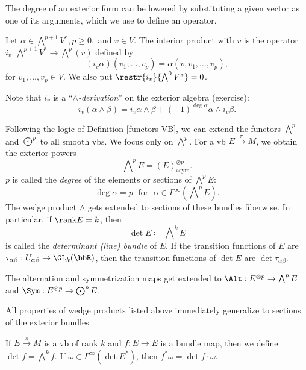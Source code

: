 The degree of an exterior form can be lowered by substituting a given vector as one of its arguments, which we use to define an operator.

\begin{defn}
    Let $\alpha\in\bigwedge\nolimits^{p+1}V^\ast, p\geq 0,$ and $v\in V$. The interior product with $v$ is the operator $i_v:\bigwedge\nolimits^{p+1}V^\ast\to \bigwedge\nolimits^p(v)$ defined by 
    \[(i_v \alpha)(v_1,\ldots,v_p)=\alpha(v,v_1,\ldots,v_p),\]
    for $v_1,\ldots,v_p\in V$. We also put $\restr{i_v}{\bigwedge\nolimits^0V^\ast}=0$.
\end{defn}

Note that $i_v$ is a ``\emph{$\wedge$-derivation}'' on the exterior algebra (exercise):
\[i_v(\alpha\wedge\beta)=i_v\alpha\wedge\beta+(-1)^{\deg \alpha}\alpha\wedge i_v\beta.\label{eq interior product derivation}\]


\begin{defn}
Following the logic of Definition \ref{functors VB}, we can extend the functors $\bigwedge\nolimits^p$ and $\bigodot\nolimits^p$ to all smooth \glspl{vb}. We focus only on $\bigwedge\nolimits^p$. For a \gls{vb} $E\overset{\pi}{\to} M$, we obtain the exterior powers
\[\bigwedge\nolimits^p E=(E)^{\otimes p}_{\text{asym}}.\]
$p$ is called the \emph{degree} of the elements or sections of $\bigwedge\nolimits^p E$: \[\deg \alpha=p\;\text{ for }\;\alpha\in\Gamma^\infty\left(\bigwedge\nolimits^p E\right).\]
The wedge product $\wedge$ gets extended to sections of these bundles fiberwise.
In particular, if $\rank E=k$, then \[\det E\coloneqq \bigwedge\nolimits^k E\] is called the \emph{determinant (line) bundle} of $E$. If the transition functions of $E$ are $\tau_{\alpha\beta}:U_{\alpha\beta}\to \GL_k(\bbR )$, then the transition functions of $\det E$ are $\det \tau_{\alpha\beta}$.

The alternation and symmetrization maps get extended to $\Alt: E^{\otimes p}\to \bigwedge\nolimits^p E$ and $\Sym: E^{\otimes p}\to \bigodot\nolimits^p E$.
\end{defn}

All properties of wedge products listed above immediately generalize to sections of the exterior bundles.

\begin{defn}
If $E\overset\pi\to M$ is a \gls{vb} of rank $k$ and $f:E\to E$ is a bundle map, then we define $\det f=\bigwedge\nolimits^k f$. If $\omega\in\Gamma^\infty(\det E^\ast)$, then $f^\ast \omega=\det f\cdot \omega$.
\end{defn}

